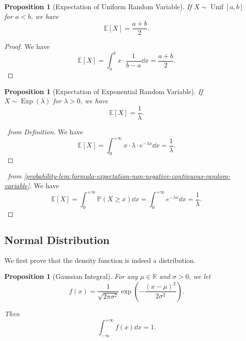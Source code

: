 \documentclass[11pt]{article}
\numberwithin{equation}{section}
\newtheorem{proposition}[theorem]{Proposition}
\theoremstyle{definition}
\theoremstyle{remark}
\newcommand{\pqty}[1]{\left(#1\right)}
\newcommand{\bqty}[1]{\left[#1\right]}
\newcommand{\ccintv}[2]{[#1,#2]}
\newcommand{\RR}{\mathbb R}
\newcommand{\plusinfty}{+\infty}
\newcommand{\minusinfty}{-\infty}
\newcommand{\Prob}{\mathbb P}
\newcommand{\Expt}{\mathbb E}
\newcommand{\Exponential}{\operatorname{Exp}}
\newcommand{\Uniform}{\operatorname{Unif}}
\begin{document}
\begin{proposition}[Expectation of Uniform Random Variable]\label{probability-proposition-032}
    \label{probability-prop:expt-uniform}%
    If \(X \sim \Uniform\ccintv{a}{b}\) for \(a < b\), we have
    \[
        \Expt\bqty{X} = \frac{a + b}{2}.
    \]
\end{proposition}

\begin{proof}\label{probability-proof-061}
    We have
    \[
        \Expt\bqty{X} = \int_{a}^{b} x \cdot \frac{1}{b - a} \dd{x} = \frac{a + b}{2}.
    \]
\end{proof}

\begin{proposition}[Expectation of Exponential Random Variable]\label{probability-proposition-033}
    \label{probability-prop:expt-exponential}%
    If \(X \sim \Exponential\pqty{\lambda}\) for \(\lambda > 0\), we have
    \[
        \Expt\bqty{X} = \frac{1}{\lambda}.
    \]
\end{proposition}

\begin{proof}[\proofname\ from Definition]\label{probability-proof-062}
    We have
    \[
        \Expt\bqty{X} = \int_{0}^{\plusinfty} x \cdot \lambda \cdot e^{-\lambda x} \dd{x} = \frac{1}{\lambda}.
    \]
\end{proof}

\begin{proof}[\proofname\ from \autoref{probability-lem:formula-expectation-non-negative-continuous-random-variable}]\label{probability-proof-063}
    We have
    \[
        \Expt\bqty{X} = \int_{0}^{\plusinfty} \Prob\pqty{X \geq x} \dd{x} = \int_{0}^{\plusinfty} e^{-\lambda x} \dd{x} = \frac{1}{\lambda}.
    \]
\end{proof}

\subsection{Normal Distribution}

We first prove that the density function is indeed a distribution.

\begin{proposition}[Gaussian Integral]\label{probability-proposition-034}
    \label{probability-prop:gaussian-integral}%
    For any \(\mu \in \RR\) and \(\sigma > 0\), we let
    \[
        f\pqty{x} = \frac{1}{\sqrt{2 \pi \sigma^2}} \exp\pqty{-\frac{\pqty{x - \mu}^2}{2 \sigma^2}}.
    \]

    Then
    \[
        \int_{\minusinfty}^{\plusinfty} f\pqty{x} \dd{x} = 1.
    \]
\end{proposition}
\end{document}
